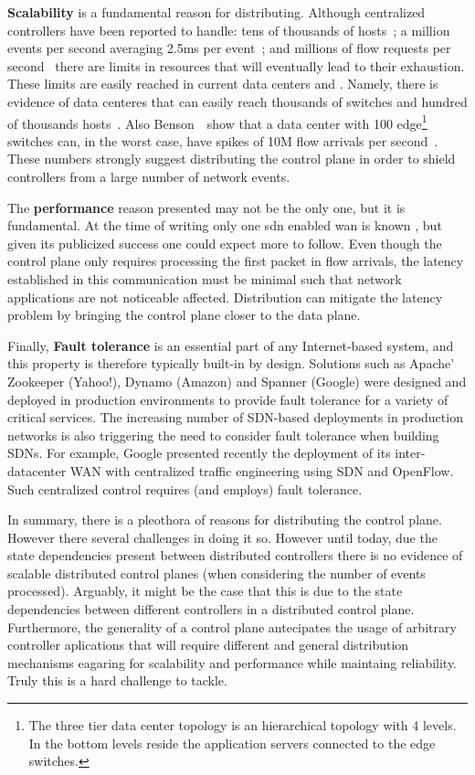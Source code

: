\textbf{Scalability} is a fundamental reason for distributing. 
Although centralized controllers have been reported to handle: tens of thousands of hosts~\cite{Casado:2007kb}; a million events per second averaging 2.5ms per event~\cite{controllerPerformance}; and millions of flow requests per second~\cite{beacon} there are limits in resources that will eventually lead to their exhaustion. 
These limits are easily reached in current data centers and . 
Namely, there is evidence of data centeres that can  easily reach thousands of switches and hundred of thousands hosts~\cite{Scott:2012tt}. 
Also Benson~\etal\ show that a data center with 100 edge\footnote{The three tier data center topology is an hierarchical topology with 4 levels. In the bottom levels reside the application servers connected to the edge switches.} switches can, in the worst case, have spikes of 10M  flow arrivals per second~\cite{}. 
These numbers strongly  suggest distributing the control plane in order to shield controllers from a large number of network events. 

The \textbf{performance} reason presented may not be the only one, but it is fundamental. 
At the time of writing only one \gls{sdn} enabled \gls{wan} is known \cite{jain2013b4}, but given its publicized success one could expect more to follow. 
Even though the control plane only requires processing the first packet in flow arrivals, the latency established in this communication must be minimal such that network applications are not noticeable affected. 
Distribution can mitigate the latency problem by bringing the control plane closer to the data plane. 

Finally,  \textbf{Fault tolerance} is an essential part of any Internet-based system, and this property is therefore typically built-in by design. 
Solutions such as Apache' Zookeeper (Yahoo!), Dynamo (Amazon)  and Spanner (Google)  were designed and deployed in production environments to provide fault tolerance for a variety of critical services.
The increasing number of SDN-based deployments in production networks is also triggering the need to consider fault tolerance when building SDNs.
For example, Google presented recently the deployment of its inter-datacenter WAN with centralized traffic engineering using SDN and OpenFlow.
Such centralized control requires (and employs) fault tolerance.

In summary, there is a pleothora of reasons for distributing the control plane. However there several challenges in doing it so. 
However until today, due the state dependencies present between distributed controllers there is no evidence of scalable distributed control planes (when considering the number of events processed). 
Arguably, it might be the case that this is due to the state dependencies between different controllers in a distributed control plane. 
Furthermore, the generality of a control plane antecipates the usage of arbitrary controller aplications that will require different and general distribution mechanisms eagaring for scalability and performance while maintaing reliability.
Truly this is a hard challenge to tackle. 

